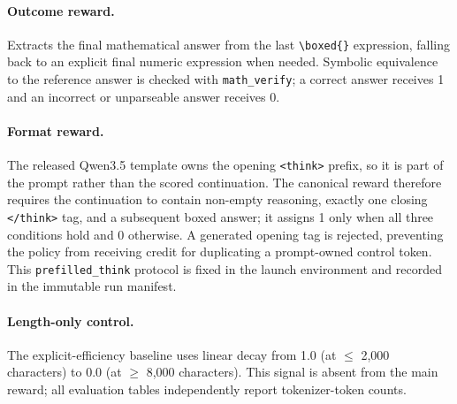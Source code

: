 \paragraph{Outcome reward.}
Extracts the final mathematical answer from the last \texttt{\textbackslash boxed\{\}} expression, falling back to an explicit final numeric expression when needed. Symbolic equivalence to the reference answer is checked with \texttt{math\_verify}; a correct answer receives 1 and an incorrect or unparseable answer receives 0.

\paragraph{Format reward.}
The released Qwen3.5 template owns the opening \texttt{<think>} prefix, so it is part of the prompt rather than the scored continuation. The canonical reward therefore requires the continuation to contain non-empty reasoning, exactly one closing \texttt{</think>} tag, and a subsequent boxed answer; it assigns 1 only when all three conditions hold and 0 otherwise. A generated opening tag is rejected, preventing the policy from receiving credit for duplicating a prompt-owned control token. This \texttt{prefilled\_think} protocol is fixed in the launch environment and recorded in the immutable run manifest.

\paragraph{Length-only control.}
The explicit-efficiency baseline uses linear decay from 1.0 (at $\leq$ 2,000 characters) to 0.0 (at $\geq$ 8,000 characters). This signal is absent from the main \method reward; all evaluation tables independently report tokenizer-token counts.

